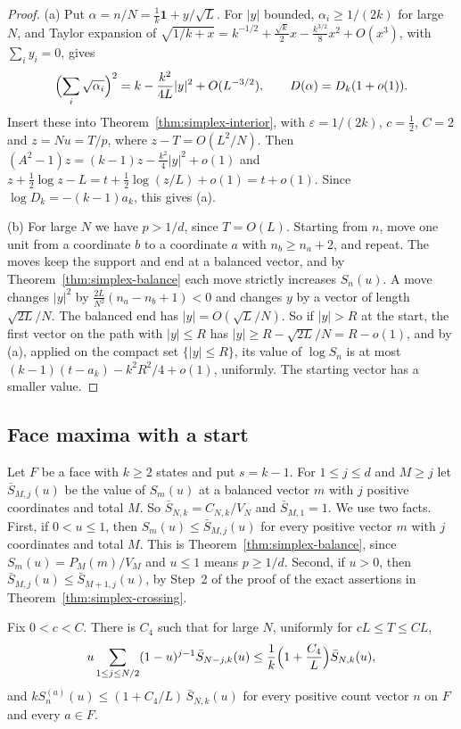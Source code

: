 \begin{proof}
(a) Put $\alpha=n/N=\frac1k\mathbf1+y/\sqrt L$. For $|y|$ bounded,
$\alpha_i\ge1/(2k)$ for large $N$, and Taylor expansion of
$\sqrt{1/k+x}=k^{-1/2}+\frac{\sqrt k}2x-\frac{k^{3/2}}8x^2+O(x^3)$, with
$\sum_iy_i=0$, gives
\[
 \Bigl(\sum_i\sqrt{\alpha_i}\Bigr)^2=k-\frac{k^2}{4L}|y|^2+O(L^{-3/2}),
 \qquad D(\alpha)=D_k(1+o(1)).
\]
Insert these into Theorem~\ref{thm:simplex-interior}, with $\varepsilon=1/(2k)$,
$c=\frac12$, $C=2$ and $z=Nu=T/p$, where $z-T=O(L^2/N)$. Then
$(A^2-1)z=(k-1)z-\frac{k^2}4|y|^2+o(1)$ and
$z+\frac12\log z-L=t+\frac12\log(z/L)+o(1)=t+o(1)$. Since
$\log D_k=-(k-1)a_k$, this gives (a).

(b) For large $N$ we have $p>1/d$, since $T=O(L)$. Starting from $n$, move one unit from a coordinate $b$ to a coordinate $a$
with $n_b\ge n_a+2$, and repeat. The moves keep the support and end at a
balanced vector, and by Theorem~\ref{thm:simplex-balance} each move strictly
increases $S_n(u)$. A move changes $|y|^2$ by $\frac{2L}{N^2}(n_a-n_b+1)<0$ and
changes $y$ by a vector of length $\sqrt{2L}/N$. The balanced end has
$|y|=O(\sqrt L/N)$. So if $|y|>R$ at the start, the first vector on the path
with $|y|\le R$ has $|y|\ge R-\sqrt{2L}/N=R-o(1)$, and by (a), applied on the
compact set $\{|y|\le R\}$, its value of $\log S_n$ is at most
$(k-1)(t-a_k)-k^2R^2/4+o(1)$, uniformly. The starting vector has a smaller value.
\end{proof}

\subsection{Face maxima with a start}

Let $F$ be a face with $k\ge2$ states and put $s=k-1$. For $1\le j\le d$ and
$M\ge j$ let $\bar S_{M,j}(u)$ be the value of $S_m(u)$ at a balanced vector $m$
with $j$ positive coordinates and total $M$. So $\bar S_{N,k}=C_{N,k}/V_N$ and
$\bar S_{M,1}=1$. We use two facts. First, if $0<u\le1$, then
$S_m(u)\le\bar S_{M,j}(u)$ for every positive vector $m$ with $j$ coordinates
and total $M$. This is Theorem~\ref{thm:simplex-balance}, since
$S_m(u)=P_M(m)/V_M$ and $u\le1$ means $p\ge1/d$. Second, if $u>0$, then
$\bar S_{M,j}(u)\le\bar S_{M+1,j}(u)$, by Step~2 of the proof of the exact
assertions in Theorem~\ref{thm:simplex-crossing}.

\begin{lemma}\label{lem:start-upper}
Fix $0<c<C$. There is $C_4$ such that for large $N$, uniformly for
$cL\le T\le CL$,
\begin{equation}\label{eq:first-run-sum}
 u\sum_{1\le j\le N/2}(1-u)^{j-1}\bar S_{N-j,k}(u)
 \le\frac1k\Bigl(1+\frac{C_4}L\Bigr)\bar S_{N,k}(u),
\end{equation}
and $kS^{(a)}_n(u)\le(1+C_4/L)\,\bar S_{N,k}(u)$ for every positive count vector
$n$ on $F$ and every $a\in F$.
\end{lemma}

